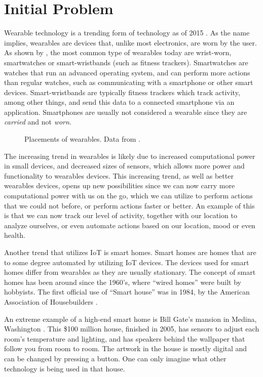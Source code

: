 \section{Initial Problem}\label{sec:initproblem}
Wearable technology is a trending form of technology as of 2015 \cite{WEARABLESTREND}. 
As the name implies, wearables are devices that, 
unlike most electronics, are worn by the user. 
As shown by , 
the most common type of wearables today are wrist-worn, 
\eg smartwatches or smart-wristbands (such as fitness trackers).
Smartwatches are watches that run an advanced operating system, 
and can perform more actions than regular watches, 
such as communicating with a smartphone or other smart devices.
Smart-wristbands are typically fitness trackers which track activity, among other things, 
and send this data to a connected smartphone via an application. 
Smartphones are usually not considered a wearable since they are \emph{carried} and not \emph{worn}. 

\begin{figure}[!htb]
  \centering
  
  \caption{Placements of wearables. Data from \protect\cite{LISTOFWEARABLES}.}
  \label{fig:wearables-placement}
\end{figure}

The increasing trend in wearables is likely due to increased computational power in small devices, 
and decreased sizes of sensors, 
which allows more power and functionality to wearables devices. 
This increasing trend, as well as better wearables devices, 
opens up new possibilities since we can now carry more computational power with us on the go, 
which we can utilize to perform actions that we could not before, 
or perform actions faster or better. 
An example of this is that we can now track our level of activity, 
together with our location to analyze ourselves, 
or even automate actions based on our location, mood or even health. 

Another trend that utilizes IoT is smart homes.
Smart homes are homes that are to some degree automated by utilizing IoT devices. 
The devices used for smart homes differ from wearables as they are usually stationary. 
The concept of smart homes has been around since the 1960's, 
where ``wired homes'' were built by hobbyists\cite{harper2003}. 
The first official use of ``Smart house'' was in 1984, 
by the American Association of Housebuilders \cite{harper2003}.

An extreme example of a high-end smart home is Bill Gate's mansion in Medina, Washington \cite{billgatehouse}.
This \$100 million house, finished in 2005, 
has sensors to adjust each room's temperature and lighting, 
and has speakers behind the wallpaper that follow you from room to room. 
The artwork in the house is mostly digital and can be changed by pressing a button. 
One can only imagine what other technology is being used in that house. 

